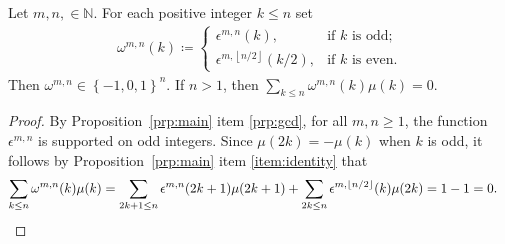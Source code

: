 \documentclass[12pt,reqno]{article}
\newcommand\floor[1]{\left\lfloor#1\right\rfloor}
\newcommand{\N}{\ensuremath{\mathbb{N}}}
\newcommand{\set}[1]{\ensuremath{\left\{{#1}\right\}}}
\begin{document}
\begin{corollary}
Let $m,n,\in\N$. For each positive integer $k\leq n$ set \begin{align*}
\omega^{m,n}(k)\coloneqq \begin{cases}
\epsilon^{m,n}(k), & \text{if $k$  is odd;}\\
\epsilon^{m,{\floor{n/2}}}(k/2), & \text{if $k$ is even.}
\end{cases}
\end{align*}
Then $\omega^{m,n}\in \set{-1,0,1}^{n}$. If $n>1$, then $\sum_{k\leq n}\omega^{m,n}(k)\mu(k)=0$.
\label{cor:omega}
\end{corollary}
\begin{proof}
By Proposition~\ref{prp:main} item \ref{prp:gcd},
for all $m,n\geq 1$, the function $\epsilon^{m,n}$ is supported on odd integers.  
Since $\mu(2k)=-\mu(k)$ when $k$ is odd,  it follows by Proposition~\ref{prp:main} item \ref{item:identity} that
\begin{align*}
\sum_{k\leq n}\omega^{m,n}(k)\mu(k) &= 
\sum_{2k+1\leq n}\epsilon^{m,n}(2k+1)\mu(2k+1) + 
\sum_{2k\leq n}\epsilon^{m,{\floor{n/2}}}(k)\mu(2k) = 1-1=0.\qedhere
\end{align*}
\end{proof}
\end{document}
